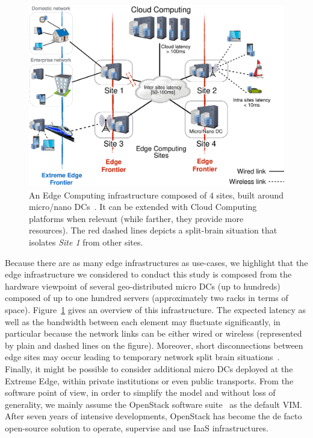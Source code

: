 \begin{figure}[t]
  \centering
  \includegraphics[width=\columnwidth]{./figures/figure_fog.pdf}
  \caption{An Edge Computing infrastructure composed of $4$ sites, built around
    micro/nano DCs~\cite{7923796}. It can be extended with Cloud Computing
    platforms when relevant (while farther, they provide more resources).
    The red dashed lines depicts a split-brain situation that isolates
    \emph{Site 1} from other sites.}
  \label{fig:fogedge-archi}
\end{figure}

Because there are as many edge infrastructures as use-cases, we
highlight that the edge infrastructure we considered to conduct this
study is composed from the hardware viewpoint of several
geo-distributed micro DCs (up to hundreds)
composed of up to one hundred servers (approximately two racks in terms of space).
Figure~\ref{fig:fogedge-archi} gives an overview of this
infrastructure. The expected latency as well as the bandwidth between
each element may fluctuate significantly, in particular because the
network links can be either wired or wireless (represented by plain
and dashed lines on the figure). Moreover, short disconnections
between edge sites may occur leading to temporary network split brain
situations~\cite{4456903}. Finally, it might be possible
to consider additional micro DCs deployed at the Extreme Edge, within
private institutions or even public transports.
%
From the software point of view, in order to simplify the model and
without loss of generality, we mainly assume the OpenStack software
suite~\cite{openstack:www} as the default VIM.  After seven years of intensive developments, OpenStack has
become the de facto open-source solution to operate, supervise and use
IaaS infrastructures.


